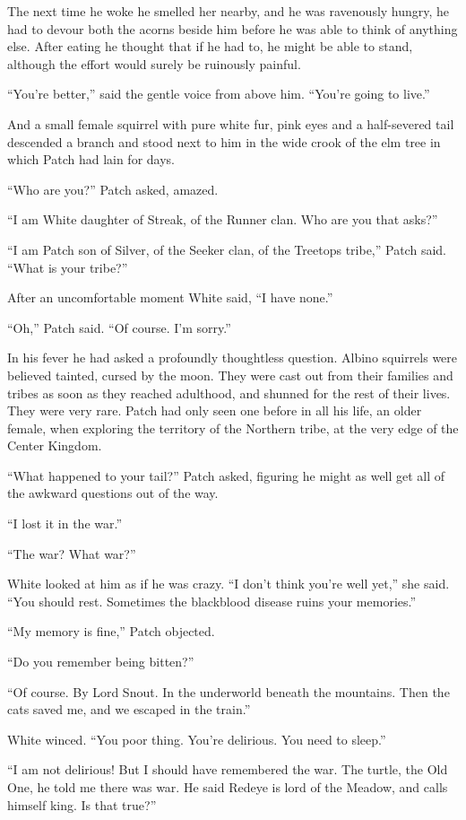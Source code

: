 \documentclass[12pt]{memoir}
\begin{document}
The next time he woke he smelled her nearby, and he was ravenously
hungry, he had to devour both the acorns beside him before he was able
to think of anything else. After eating he thought that if he had to,
he might be able to stand, although the effort would surely be
ruinously painful.

“You’re better,” said the gentle voice from above him. “You’re going
to live.”

And a small female squirrel with pure white fur, pink eyes and a
half-severed tail descended a branch and stood next to him in the wide
crook of the elm tree in which Patch had lain for days.

“Who are you?” Patch asked, amazed.

“I am White daughter of Streak, of the Runner clan. Who are you that
asks?”

“I am Patch son of Silver, of the Seeker clan, of the Treetops tribe,”
Patch said. “What is your tribe?”

After an uncomfortable moment White said, “I have none.”

“Oh,” Patch said. “Of course. I’m sorry.”

In his fever he had asked a profoundly thoughtless question. Albino
squirrels were believed tainted, cursed by the moon. They were cast
out from their families and tribes as soon as they reached adulthood,
and shunned for the rest of their lives. They were very rare. Patch
had only seen one before in all his life, an older female, when
exploring the territory of the Northern tribe, at the very edge of the
Center Kingdom.

“What happened to your tail?” Patch asked, figuring he might as well
get all of the awkward questions out of the way.

“I lost it in the war.”

“The war? What war?”

White looked at him as if he was crazy. “I don’t think you’re well
yet,” she said. “You should rest. Sometimes the blackblood disease
ruins your memories.”

“My memory is fine,” Patch objected.

“Do you remember being bitten?”

“Of course. By Lord Snout. In the underworld beneath the
mountains. Then the cats saved me, and we escaped in the train.”

White winced. “You poor thing. You’re delirious. You need to sleep.”

“I am not delirious! But I should have remembered the war. The turtle,
the Old One, he told me there was war. He said Redeye is lord of the
Meadow, and calls himself king. Is that true?”
\end{document}

